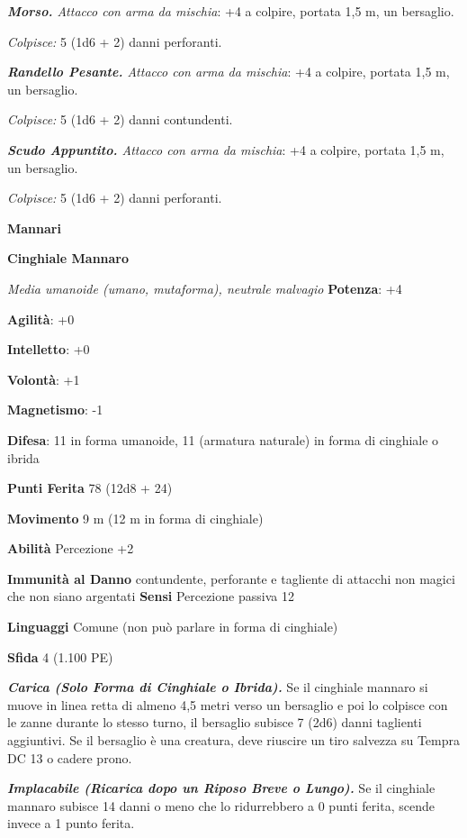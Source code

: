 \begin{multicols}{2}
\emph{\textbf{Morso.} Attacco con arma da mischia}: +4 a colpire,
portata 1,5 m, un bersaglio.

\emph{Colpisce:} 5 (1d6 + 2) danni perforanti.

\emph{\textbf{Randello Pesante.} Attacco con arma da mischia}: +4 a
colpire, portata 1,5 m, un bersaglio.

\emph{Colpisce:} 5 (1d6 + 2) danni contundenti.

\emph{\textbf{Scudo Appuntito.} Attacco con arma da mischia}: +4 a
colpire, portata 1,5 m, un bersaglio.

\emph{Colpisce:} 5 (1d6 + 2) danni perforanti.



\textbf{Mannari}

\textbf{Cinghiale Mannaro}

\emph{Media umanoide (umano, mutaforma), neutrale malvagio}
\textbf{Potenza}: +4

\textbf{Agilità}: +0

\textbf{Intelletto}: +0

\textbf{Volontà}: +1

\textbf{Magnetismo}: -1

\textbf{Difesa}: 11 in forma umanoide, 11 (armatura naturale) in
forma di cinghiale o ibrida

\textbf{Punti Ferita} 78 (12d8 + 24)

\textbf{Movimento} 9 m (12 m in forma di cinghiale)

\textbf{Abilità} Percezione +2

\textbf{Immunità al Danno} contundente, perforante e tagliente di
attacchi non magici che non siano argentati \textbf{Sensi} Percezione
passiva 12

\textbf{Linguaggi} Comune (non può parlare in forma di cinghiale)

\textbf{Sfida} 4 (1.100 PE)

\emph{\textbf{Carica (Solo Forma di Cinghiale o Ibrida).}} Se il
cinghiale mannaro si muove in linea retta di almeno 4,5 metri verso un
bersaglio e poi lo colpisce con le zanne durante lo stesso turno, il
bersaglio subisce 7 (2d6) danni taglienti aggiuntivi. Se il bersaglio è
una creatura, deve riuscire un tiro salvezza su Tempra DC 13 o cadere
prono.

\emph{\textbf{Implacabile (Ricarica dopo un Riposo Breve o Lungo).}} Se
il cinghiale mannaro subisce 14 danni o meno che lo ridurrebbero a 0
punti ferita, scende invece a 1 punto ferita.


\end{multicols}
